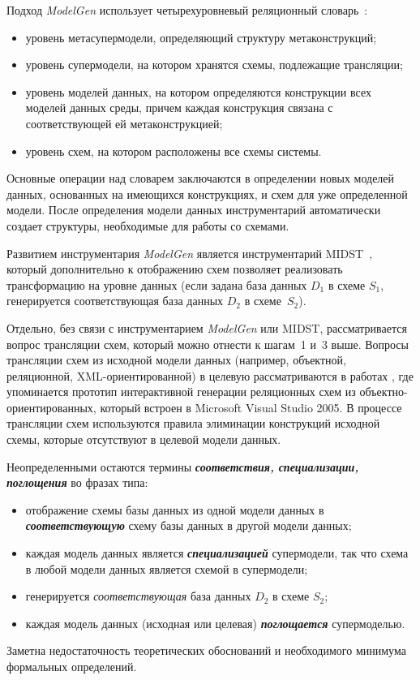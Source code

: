 \begin{multicols}{2}
Подход {\em ModelGen} использует четырехуровневый реляционный словарь~\cite{At05-1}:
\begin{itemize}
\item уровень метасупермодели, определяющий структуру метаконструкций;
\item уровень супермодели, на котором хранятся схемы, подлежащие трансляции;
\item уровень моделей данных, на котором определяются конструкции всех
моделей данных среды, причем каждая конструкция связана с
соответствующей ей метаконструкцией;
\item уровень схем, на котором расположены все схемы системы.
\end{itemize}

Основные операции над словарем заключаются в определении новых моделей
данных, основанных на имеющихся конструкциях, и схем для уже
определенной модели. После определения модели данных инструментарий
автоматически создает структуры, необходимые для работы со схемами.

Развитием инструментария {\em ModelGen} является инструментарий MIDST~\cite{At07-1},
который дополнительно к отображению схем позволяет
реализовать трансформацию на уровне данных (если задана база данных
$D_1$ в схеме $S_1$, генерируется соответ\-ст\-ву\-ющая база данных $D_2$ в
схеме~$S_2$).

Отдельно, без связи с инструментарием {\em Model\-Gen} или MIDST,
рассматривается вопрос трансляции схем, который можно отнести к шагам~1 и~3
выше. Вопросы трансляции схем из исходной модели данных
(например, объектной, реляционной, XML-ориентированной) в целевую
рас\-смат\-ри\-ва\-ются в работах \cite{Be05}, где упоминается прототип интерактивной
генерации реляционных схем из объектно-ориентированных, который
встроен в Microsoft Visual Studio 2005. В процессе трансляции схем
используются правила элиминации конструкций исходной схемы, которые
отсутствуют в целевой модели данных.

Неопределенными остаются термины {\bfseries\textit{соответствия,
специализации, поглощения}} во фразах типа:
\begin{itemize}
\item отображение схемы базы данных из одной
модели данных в {\bfseries\textit{соответствующую}} схему базы данных в
другой модели данных;
\item каждая модель данных является {\bfseries\textit{специализацией}}
супермодели, так что схема в любой модели данных является схемой в
супермодели;
\item генерируется {\em соответствующая} база данных $D_2$ в
схеме $S_2$;
\item каждая модель данных (исходная или целевая)
{\bfseries\textit{поглощается}} супермоделью.
\end{itemize}
Заметна недостаточность теоретических
обоснований и необходимого минимума формальных определений.


\end{multicols}
